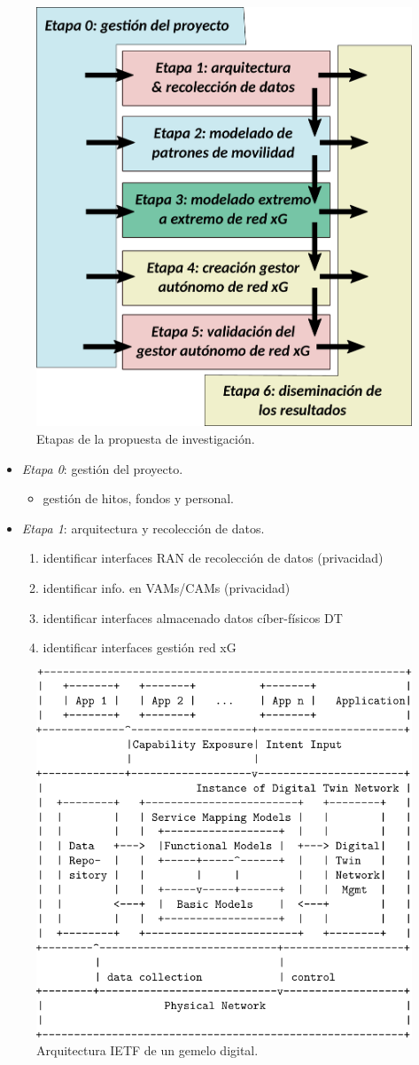 \documentclass[xcolor=table,xcolor=x11names]{beamer}
\begin{document}
\begin{frame}{\subsecname}
\begin{figure}[t]
    \centering
    \includegraphics[width=.5\textwidth]{figures/etapas}
    \caption{Etapas de la propuesta de investigación.}
    \label{fig:etapas}
\end{figure}
\end{frame}



\begin{frame}{\subsecname}
    \begin{itemize}
        \item \emph{Etapa 0}: gestión del proyecto.
            \begin{itemize}
                \item gestión de hitos, fondos y personal.
            \end{itemize}
        \item \emph{Etapa 1}: arquitectura y recolección
            de datos.
            \begin{enumerate}
                \item identificar interfaces RAN
                    de recolección de datos (privacidad)
                \item identificar info. en VAMs/CAMs (privacidad)
                \item identificar interfaces almacenado
                    datos cíber-físicos DT
                \item identificar interfaces gestión red xG
            \end{enumerate}
    \end{itemize}

    \begin{figure}
        \includegraphics[width=.3\textwidth]{figures/digital-twin}
        \caption{Arquitectura IETF de un gemelo digital.}
    \end{figure}
\end{frame}
\end{document}

